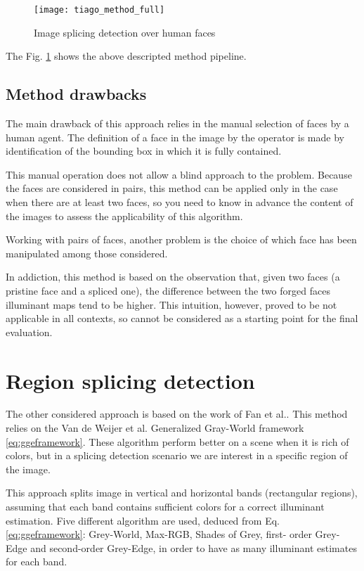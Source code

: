 \begin{figure}[h!]
  \centering
    \texttt{[image: tiago\_method\_full]}
    \caption{Image splicing detection over human faces}
    \label{fig:tiago_method_full}
\end{figure}

The Fig. \ref{fig:tiago_method_full} shows the above descripted method pipeline.

\subsection{Method drawbacks}

The main drawback of this approach relies in the manual selection of faces by a human agent. The definition of a face in the image by the operator is made by identification of the bounding box in which it is fully contained.

This manual operation does not allow a blind approach to the problem. Because the faces are considered in pairs, this method can be applied only in the case when there are at least two faces, so you need to know in advance the content of the images to assess the applicability of this algorithm.

Working with pairs of faces, another problem is the choice of which face has been manipulated among those considered. 

In addiction, this method is based on the observation that, given two faces (a pristine face and a spliced one), the difference between the two forged faces illuminant maps tend to be higher. This intuition, however, proved to be not applicable in all contexts, so cannot be considered as a starting point for the final evaluation.

\section{Region splicing detection}

The other considered approach is based on the work of Fan et al.\cite{fan2015image}. This method relies on the Van de Weijer et al.\cite{van2007edge} Generalized Gray-World framework \ref{eq:ggeframework}. These algorithm perform better on a scene when it is rich of colors, but in a splicing detection scenario we are interest in a specific region of the image.

This approach splits image in vertical and horizontal bands (rectangular regions), assuming that each band contains sufficient colors for a correct illuminant estimation. Five different algorithm are used, deduced from Eq. \ref{eq:ggeframework}: Grey-World, Max-RGB, Shades of Grey, first- order Grey-Edge and second-order Grey-Edge, in order to have as many illuminant estimates for each band.

